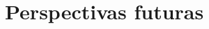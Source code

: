 \documentclass[ twoside,openright,titlepage,numbers=noenddot,headinclude,%
                footinclude=true,cleardoublepage=empty,abstractoff, %
                BCOR=5mm,paper=a4,fontsize=11pt,%
                american,%
                ]{scrreprt}
\begin{document}
\part{Perspectivas futuras}

\appendix
\cleardoublepage
%
\cleardoublepage
\end{document}
